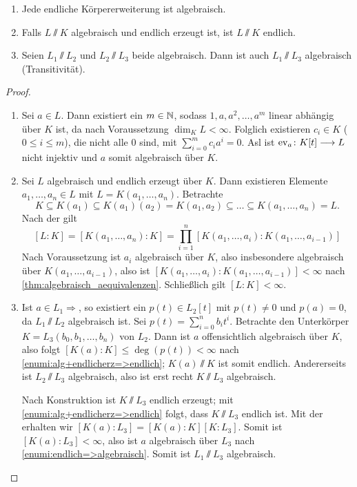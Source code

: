 \documentclass[12pt,a4paper]{scrartcl}
\begin{document}
\begin{satz}\label{thm:algebraischekes}
	\leavevmode
	\begin{enumerate}
		\item Jede endliche Körpererweiterung ist algebraisch.\label{enumi:endlich=>algebraisch}
		\item Falls $L\sslash K$ algebraisch und endlich erzeugt ist, ist $L\sslash K$ endlich.\label{enumi:alg+endlicherz=>endlich}
		\item Seien $L_1\sslash L_2$ und $L_2\sslash L_3$ beide algebraisch. Dann ist auch $L_1\sslash L_3$ algebraisch (Transitivität).
	\end{enumerate}
\end{satz}
\begin{proof}
	\leavevmode
	\begin{enumerate}
		\item Sei $a\in L$. Dann existiert ein $m\in \mathbb N$, sodass $1, a, a^2, \dots, a^m$ linear abhängig über $K$ ist, da nach Voraussetzung $\dim_KL<\infty$. Folglich existieren $c_i\in K$ ($0\leq i \leq m$), die nicht alle $0$ sind, mit
		$\sum_{i=0}^mc_ia^i = 0$. Asl ist $\operatorname{ev}_a\colon K[t]\longrightarrow L$ nicht injektiv und $a$ somit algebraisch über $K$.
		\item Sei $L$ algebraisch und endlich erzeugt über $K$. Dann existieren Elemente $a_1,\dots, a_n\in L$ mit $L = K(a_1,\dots, a_n)$. Betrachte \[K \subseteq K(a_1) \subseteq K(a_1)(a_2) = K(a_1,a_2)\subseteq \dots \subseteq K(a_1,\dots, a_n) = L.\] Nach der  gilt $$[L:K] = [K(a_1,\dots, a_n):K] = \prod_{i = 1}^{n}[K(a_1, \dots, a_i):K(a_1,\dots, a_{i-1})]$$
		Nach Voraussetzung ist $a_i$ algebraisch über $K$, also insbesondere algebraisch über $K(a_1,\dots, a_{i-1})$, also ist $[K(a_1,\dots, a_i): K(a_1,\dots , a_{i-1})] < \infty$ nach \cref{thm:algebraisch_aequivalenzen}. Schließlich gilt $[L:K]< \infty$.
		\item Ist $a\in L_1\Rightarrow$, so existiert ein $p(t)\in L_2[t]$ mit $p(t)\neq 0$ und $p(a) = 0$, da $L_1\sslash L_2$ algebraisch ist. Sei $p(t) = \sum_{i=0}^nb_it^i$. Betrachte den Unterkörper $K = L_3(b_0,b_1,\dots, b_n)$ von $L_2$. Dann ist $a$ offensichtlich algebraisch über $K$, also folgt $[K(a):K] \leq \deg(p(t)) <\infty$ nach \ref{enumi:alg+endlicherz=>endlich}; $K(a)\sslash K$ ist somit endlich. Andererseits ist $L_2\sslash L_3$ algebraisch, also ist erst recht $K\sslash L_3$ algebraisch.
		
		Nach Konstruktion ist $K\sslash L_3$ endlich erzeugt; mit \ref{enumi:alg+endlicherz=>endlich} folgt, dass $K\sslash L_3$ endlich ist. Mit der  erhalten wir $[K(a):L_3] = [K(a):K][K:L_3]$. Somit ist $[K(a):L_3] <\infty$, also ist $a$ algebraisch über $L_3$ nach \ref{enumi:endlich=>algebraisch}. Somit ist $L_1 \sslash L_3$ algebraisch.
	\end{enumerate}
\end{proof}
\end{document}
